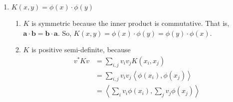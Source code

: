 \documentclass[12pt]{article}
\newcommand{\parens}[1]{\left(#1\right)}
\newcommand{\chev}[1]{\left<#1\right>}
\begin{document}
\begin{enumerate}
\begin{enumerate}
\begin{proof}
                    $K$ is positive semi-definite because
                    \begin{equation}
                        \begin{split}
                            K\parens{x,y}&=\parens{x\cdot y+c}^3\\
                            &=\parens{x\cdot y}^3+3c\parens{x\cdot y}^2+3c^2x\cdot y+c^3\\
                            &=K_3+3cK_2+3c^2K_1+c^3\\
                        \end{split}
                    \end{equation}
                    where $K_1,K_2,K_3$ are all valid kernels (from lecture). So, we
                    also know that $K_1,K_2,K_3$ are all symmetric positive semi-definite. So,
                    \begin{equation}
                        \begin{split}
                            v^*Kv&=v^*\parens{K_3+3cK_2+3c^2K_1+c^3}v\\
                            &=v^*K_3v+v^*3cK_2v+v^*3c^2K_1v+v^*c^3v\\
                            &\geq0\\
                        \end{split}
                    \end{equation}
                    whenever $c\geq0$.
                \end{proof}
        \end{enumerate}
    \item $K(x,y)=\phi(x)\cdot\phi(y)$
        \begin{enumerate}
            \item $K$ is symmetric because the inner product is commutative.
            That is, $\mathbf{a}\cdot\mathbf{b}=\mathbf{b}\cdot\mathbf{a}$. So,
            $K(x,y)=\phi(x)\cdot\phi(y)=\phi(y)\cdot\phi(x)$.
            \item $K$ is positive semi-definite, because
                \begin{equation}
                    \begin{split}
                        v^*Kv&=\sum_{i,j}v_iv_jK(x_i,x_j)\\
                        &=\sum_{i,j}v_iv_j\chev{\phi\parens{x_i},\phi\parens{x_j}}\\
                        &=\chev{\sum_{i}v_i\phi\parens{x_i},\sum_{j}v_j\phi\parens{x_j}}\\

\end{split}
\end{equation}
\end{enumerate}
\end{enumerate}
\end{document}
